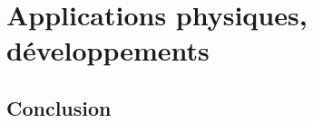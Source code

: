 \documentclass[french]{book} %
\theoremstyle{plain}
\begin{document}
			

	



\part{Applications physiques, développements}


	

	

	

	







\chapter*{Conclusion}   %













%





\end{document}
